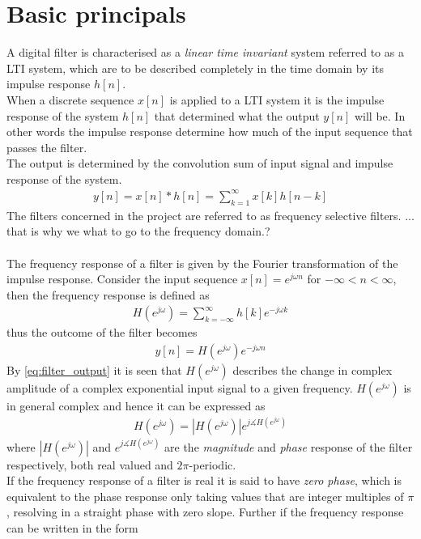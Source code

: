 \section{Basic principals}

A digital filter is characterised as a \textit{linear time invariant} system referred to as a LTI system, which are to be described completely in the time domain by its impulse response $h[n]$. \\
When a discrete sequence $x[n]$ is applied to a LTI system it is the impulse response of the system $h[n]$ that determined what the output $y[n]$ will be. In other words the impulse response determine how much of the input sequence that passes the filter. \\ 
The output is determined by the convolution sum of input signal and impulse response of the system.
\begin{align}
y[n] = x[n]*h[n] = \sum_{k=1}^{\infty} x[k]h[n-k]
\end{align}  
The filters concerned in the project are referred to as frequency selective filters. ... that is why we what to go to the frequency domain.? \\
\\   
The frequency response of a filter is given by the Fourier transformation of the impulse response. Consider the input sequence $x[n]=e^{j\omega n}$ for $-\infty < n <\infty$, then the frequency response is defined as
\begin{align}
H(e^{j\omega})=\sum_{k=-\infty}^{\infty}h[k]e^{-j\omega k}
\end{align}
thus the outcome of the filter becomes 
\begin{align}
y[n]=H(e^{j\omega})e^{-j\omega n} \label{eq:filter_output}
\end{align} 
By \eqref{eq:filter_output} it is seen that $H(e^{j\omega})$ describes the change in complex amplitude of a complex exponential input signal to a given frequency. $H(e^{j\omega})$ is in general complex and hence it can be expressed as
\begin{align}
H(e^{j\omega})=|H(e^{j\omega})|e^{j\measuredangle H(e^{j\omega})}
\end{align}  
where $|H(e^{j\omega})|$ and $e^{j\measuredangle H(e^{j\omega})}$ are the \textit{magnitude} and \textit{phase} response of the filter respectively, both real valued and $2\pi$-periodic.\\ 
If the frequency response of a filter is real it is said to have \textit{zero phase}, which is equivalent to the phase response only taking values that are integer multiples of $\pi$, resolving in a straight phase with zero slope.   Further if the frequency response can be written in the form 
